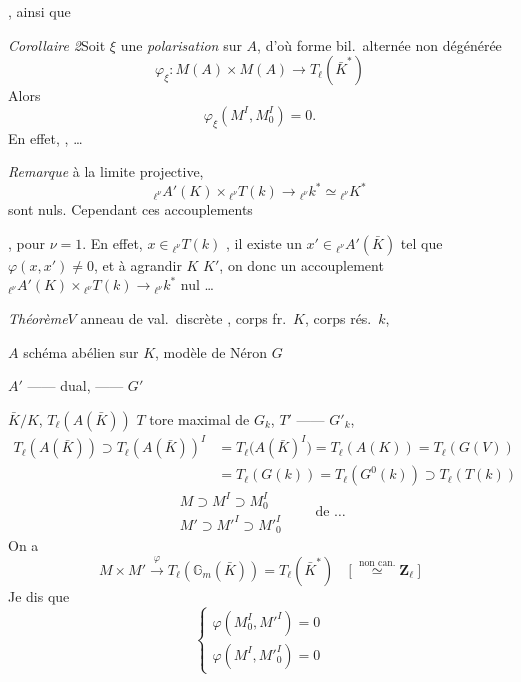 \documentclass[11pt,a4paper]{article}
\begin{document}
, ainsi que 

\emph{Corollaire 2}\quad Soit $\xi$ une \emph{polarisation} sur $A$, d'où
 forme bil.\ alternée non dégénérée
\[
\varphi_\xi \colon M(A) \times M(A) \to T_\ell(\bar K^*)
\]
Alors
\[
\varphi_\xi(M^I, M^I_0) = 0 .
\]
En effet,  \ill{}  \ill{} \ill{}
, \ill{} \ill{} \ill{} \ill{} \ill{} \ldots

\emph{Remarque}\quad {} à la limite projective,
 
\[
{}_{\ell^\nu}A'(K) \times {}_{\ell^\nu}T(k) \to {}_{\ell^\nu}k^* \simeq {}_{\ell^\nu}K^*
\]
sont nuls. Cependant ces accouplements \ill{} \ill{} \ill{}

\ill{}   \ill{} \ill{}, \ill{} \ill{}
 pour $\nu = 1$. En effet,  \struck{\ill{}}
$x \in {}_{\ell^\nu}T(k)$   \ill{} , il existe
un $x' \in {}_{\ell^\nu}A'(\bar K)$ tel que \struck{\ill{}} $\varphi(x, x')
\neq 0$, et \struck{\ill{}}  à agrandir $K$ 
$K'$, on  donc un accouplement ${}_{\ell^\nu}A'(K) \times
{}_{\ell^\nu}T(k) \to {}_{\ell^\nu}k^*$  nul \ldots
{}


\emph{Théorème}\quad $V$ anneau de val.\ discrète ,
corps fr.\ $K$, corps rés.\ $k$,

$A$ schéma abélien sur $K$, modèle de Néron $G$

$A'$ \quad ------ \quad dual, \quad ------ \quad $G'$

 $\bar K/K$, $T_\ell(A(\bar K))$ \qquad $T$ tore maximal de
$G_k$, $T'$ \quad ------ \quad $G'_k$,
\[
\begin{aligned}
T_\ell(A(\bar K)) \supset T_\ell(A(\bar K))^I &= T_\ell\bigl(A(\bar K)^I\bigr)
= T_\ell(A(K)) = T_\ell(G(V)) \\
&= T_\ell(G(k)) = T_\ell(G^0(k)) \supset T_\ell(T(k))
\end{aligned}
\]
\[
\begin{gathered}
M \supset M^I \supset M^I_0 \\
M' \supset M'^I \supset M'^I_0
\end{gathered}
\qquad \text{de } \ldots
\]
On a
\[
M \times M' \xrightarrow{\ \varphi\ } T_\ell(\mathbb{G}_m(\bar K)) =
T_\ell(\bar K^*) \quad \bigl[\ \overset{\text{non can.}}{\simeq}
\mathbf{Z}_\ell\ \bigr]
\]
Je dis que
\[
\begin{cases}
\varphi(M^I_0, M'^I) = 0 \\
\varphi(M^I, M'^I_0) = 0
\end{cases}
\]
\end{document}

